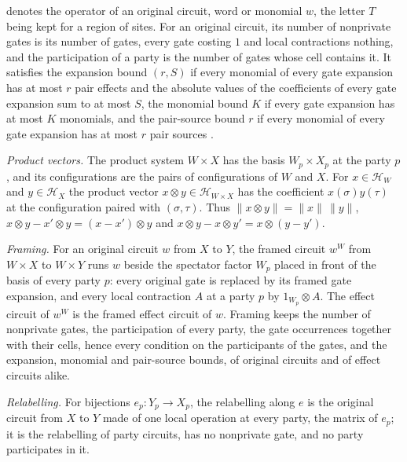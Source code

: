 \begin{definition}
    denotes the operator of an original circuit, word or monomial $w$, the letter $T$ being kept
    for a region of sites. For an original circuit, its number of
    nonprivate gates is its number of gates, every gate costing $1$ and local contractions
    nothing, and the participation of a party is the number of gates whose cell contains it.
    It satisfies the expansion bound $(r,S)$ if every monomial of every gate expansion has at
    most $r$ pair effects and the absolute values of the coefficients of every gate expansion
    sum to at most $S$, the monomial bound $K$ if every gate expansion has at most $K$
    monomials, and the pair-source bound $r$ if every monomial of every gate expansion has at
    most $r$ pair sources \cite[Theorem~5.2]{OpenAI2026PolynomialPEPS}.

    \emph{Product vectors.} The product system $W\times X$ has the basis $W_p\times X_p$ at the
    party $p$, and its configurations are the pairs of configurations of $W$ and $X$. For
    $x\in\mathcal H_W$ and $y\in\mathcal H_X$ the product vector
    $x\otimes y\in\mathcal H_{W\times X}$ has the coefficient $x(\sigma)y(\tau)$ at the
    configuration paired with $(\sigma,\tau)$. Thus
    $\lVert x\otimes y\rVert=\lVert x\rVert\,\lVert y\rVert$,
    $x\otimes y-x'\otimes y=(x-x')\otimes y$ and $x\otimes y-x\otimes y'=x\otimes(y-y')$.

    \emph{Framing.} For an original circuit $w$ from $X$ to $Y$, the framed circuit $w^W$ from
    $W\times X$ to $W\times Y$ runs $w$ beside the spectator factor $W_p$ placed in front of the
    basis of every party $p$: every original gate is replaced by its framed gate expansion, and
    every local contraction $A$ at a party $p$ by $1_{W_p}\otimes A$. The effect circuit of
    $w^W$ is the framed effect circuit of $w$. Framing keeps the number of nonprivate gates,
    the participation of every party, the gate occurrences together with their cells, hence
    every condition on the participants of the gates, and the expansion, monomial and
    pair-source bounds, of original circuits and of effect circuits alike.

    \emph{Relabelling.} For bijections $e_p:Y_p\to X_p$, the relabelling along $e$ is the
    original circuit from $X$ to $Y$ made of one local operation at every party, the matrix of
    $e_p$; it is the relabelling of party circuits, has no nonprivate gate, and no party
    participates in it.


\end{definition}
